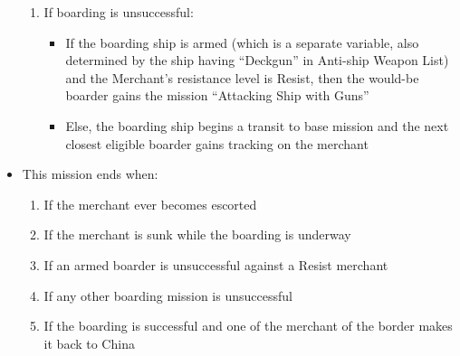 \documentclass{article}
\begin{document}
\begin{itemize}
\begin{enumerate}[label=\arabic*)]
                \item If boarding is unsuccessful:
                    \begin{itemize}
                        \item If the boarding ship is armed (which is a separate variable, also determined by the ship having ``Deckgun'' in Anti-ship Weapon List) and the Merchant's resistance level is Resist, then the would-be boarder gains the mission ``Attacking Ship with Guns'' 
                        \item Else, the boarding ship begins a transit to base mission and the next closest eligible boarder gains tracking on the merchant 
                    \end{itemize} 
            \end{enumerate}
            \item{This mission ends when:}
                \begin{enumerate}[label=\arabic*)]
                    \item If the merchant ever becomes escorted  \par
                    [hunter returns to player assigned mission, record hunter deterred]
                    \item If the merchant is sunk while the boarding is underway \par
                    [hunter returns to player assigned mission]
                    \item If an armed boarder is unsuccessful against a Resist merchant \par
                    [Hunter begins mission `Attacking Ship With Guns']
                    \item If any other boarding mission is unsuccessful \par
                    [Hunter begins return to base mission, next closest eligible boarder gains `tracking' mission on the merchant]
                    \item If the boarding is successful and one of the merchant of the border makes it back to China \par
                    [despawn both, record successful seizure of merchant]
                \end{enumerate}
        \end{itemize}
            
\end{document}
